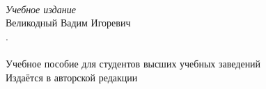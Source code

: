 \newpage
\thispagestyle{empty}
~\vfill
\begin{centering}
  \textit{Учебное издание}\\[18pt]
  Великодный Вадим Игоревич\\[6pt]
  {\Title. \SubTitle}\\[6pt]
  \PubType\\[18pt]
  Учебное пособие для студентов высших учебных заведений\\[18pt]
  Издаётся в авторской редакции\\
\end{centering}
\vspace{3cm}
